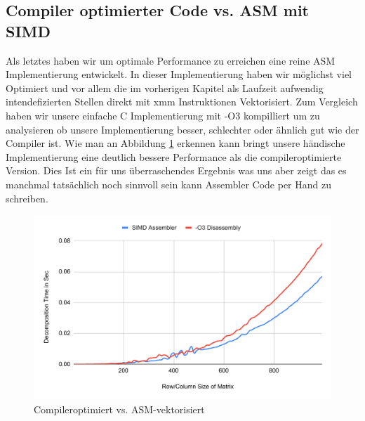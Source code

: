 \documentclass[course=erap]{aspdoc}
\begin{document}
\subsection{Compiler optimierter Code vs. ASM mit SIMD}
Als letztes haben wir um optimale Performance zu erreichen eine reine ASM Implementierung entwickelt. In dieser Implementierung haben wir möglichst viel Optimiert und vor allem die im vorherigen Kapitel als Laufzeit aufwendig
intendefizierten Stellen direkt mit xmm Instruktionen Vektorisiert. Zum Vergleich haben wir unsere einfache C Implementierung mit -O3 kompilliert um zu analysieren ob unsere Implementierung besser, schlechter oder ähnlich gut wie der Compiler ist.
Wie man an Abbildung \ref{CvsASM} erkennen kann bringt unsere händische Implementierung eine deutlich bessere Performance als die compileroptimierte Version. Dies Ist ein für uns überraschendes Ergebnis was uns aber zeigt das 
es manchmal tatsächlich noch sinnvoll sein kann Assembler Code per Hand zu schreiben.
  \begin{figure}[H]
  \begin{center}
  \caption{Compileroptimiert vs. ASM-vektorisiert} 
  \label{CvsASM}
  \includegraphics[width = 0.8\linewidth]{CvsASM.pdf}
  \end{center}
  \end{figure}



\end{document}
